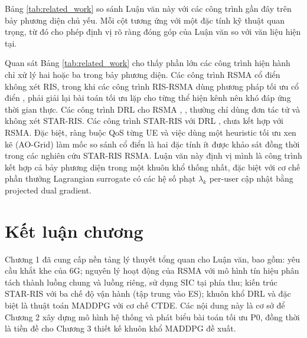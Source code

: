 Bảng \ref{tab:related_work} so sánh Luận văn này với các công trình
gần đây trên bảy phương diện chủ yếu. Mỗi cột tương ứng với một đặc
tính kỹ thuật quan trọng, từ đó cho phép định vị rõ ràng đóng góp của
Luận văn so với văn liệu hiện tại.



Quan sát Bảng \ref{tab:related_work} cho thấy phần lớn các công trình
hiện hành chỉ xử lý hai hoặc ba trong bảy phương diện. Các công trình
RSMA cổ điển \cite{mao2022rsma} không xét RIS, trong khi các công trình
RIS-RSMA dùng phương pháp tối ưu cổ điển \cite{soleymani2024starris},
\cite{gomes2024performance} phải giải lại bài toán tối ưu lặp cho từng
thể hiện kênh nên khó đáp ứng thời gian thực. Các
công trình DRL cho RSMA \cite{hieu2021optimal}, \cite{hua2023learning},
\cite{wu2024deep} thường chỉ dùng đơn tác tử và không xét STAR-RIS.
Các công trình STAR-RIS với DRL \cite{huang2024starrisuav},
\cite{dange2026collaborative} chưa kết hợp với RSMA. Đặc biệt, ràng
buộc QoS từng UE và việc dùng một heuristic tối ưu xen kẽ (AO-Grid)
làm mốc so sánh cổ điển là hai đặc tính ít được khảo sát đồng thời
trong các nghiên cứu STAR-RIS RSMA. Luận văn này định vị mình là công
trình kết hợp cả bảy phương diện trong một khuôn khổ thống nhất, đặc
biệt với cơ chế phần thưởng Lagrangian surrogate có các hệ số phạt
$\lambda_k$ per-user cập nhật bằng projected dual gradient.

\section*{Kết luận chương}

Chương 1 đã cung cấp nền tảng lý thuyết tổng quan cho Luận văn, bao gồm:
yêu cầu khắt khe của 6G; nguyên lý hoạt động của RSMA với mô hình tín hiệu
phân tách thành luồng chung và luồng riêng, sử dụng SIC tại phía thu;
kiến trúc STAR-RIS với ba chế độ vận hành (tập trung vào ES); khuôn khổ
DRL và đặc biệt là thuật toán MADDPG với cơ chế CTDE. Các nội dung này là
cơ sở để Chương 2 xây dựng mô hình hệ thống và phát biểu bài toán tối ưu
P0, đồng thời là tiền đề cho Chương 3 thiết kế khuôn khổ MADDPG đề xuất.
